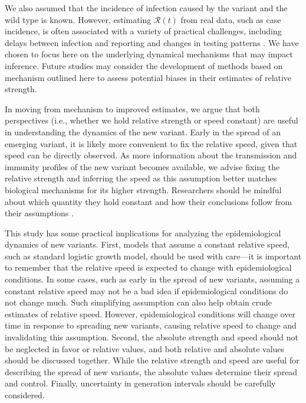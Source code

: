 \documentclass[12pt]{article}
\newcommand{\RR}{\ensuremath{{\mathcal R}}\xspace}
\begin{document}
We also assumed that the incidence of infection caused by the variant and the wild type is known.
However, estimating $\RR(t)$ from real data, such as case incidence, is often associated with a variety of practical challenges, including delays between infection and reporting and changes in testing patterns \citep{gostic2020practical}.
We have chosen to focus here on the underlying dynamical mechanisms that may impact inference.
Future studies may consider the development of methods based on mechanism outlined here to assess potential biases in their estimates of relative strength. 

In moving from mechanism to improved estimates, we argue that both perspectives (i.e., whether we hold relative strength or speed constant) are useful in understanding the dynamics of the new variant.
Early in the spread of an emerging variant, it is likely more convenient to fix the relative speed, given that speed can be directly observed.
As more information about the transmission and immunity profiles of the new variant becomes available, we advise fixing the relative strength and inferring the speed as this assumption better matches biological mechanisms for its higher strength.
Researchers should be mindful about which quantity they hold constant and how their conclusions follow from their assumptions \citep{doi:10.1098/rspb.2020.1556}.

This study has some practical implications for analyzing the epidemiological dynamics of new variants.
First, models that assume a constant relative speed, such as standard logistic growth model, should be used with care---it is important to remember that the relative speed is expected to change with epidemiological conditions.
In some cases, such as early in the spread of new variants, assuming a constant relative speed may not be a bad idea if epidemiological conditions do not change much. Such simplifying assumption can also help obtain crude estimates of relative speed. However, epidemiological conditions will change over time in response to spreading new variants, causing relative speed to change and invalidating this assumption.
Second, the absolute strength and speed should not be neglected in favor or relative values, and both relative and absolute values should be discussed together.
While the relative strength and speed are useful for describing the spread of new variants, the absolute values determine their spread and control.
Finally, uncertainty in generation intervals should be carefully considered.
\end{document}
